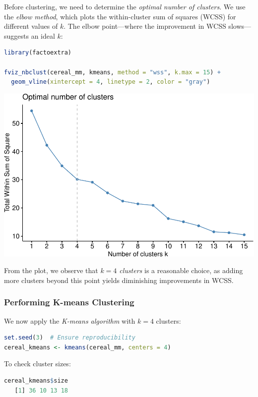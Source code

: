 \documentclass[
]{book}
\theoremstyle{definition}
\theoremstyle{definition}
\theoremstyle{definition}
\theoremstyle{definition}
\theoremstyle{remark}
\begin{document}
Before clustering, we need to determine the \emph{optimal number of clusters}. We use the \emph{elbow method}, which plots the within-cluster sum of squares (WCSS) for different values of \(k\). The elbow point---where the improvement in WCSS slows---suggests an ideal \(k\):

\begin{lstlisting}[language=R]
library(factoextra)

fviz_nbclust(cereal_mm, kmeans, method = "wss", k.max = 15) + 
  geom_vline(xintercept = 4, linetype = 2, color = "gray")
\end{lstlisting}

\begin{center}\includegraphics[width=0.7\linewidth]{clustering_files/figure-latex/unnamed-chunk-11-1} \end{center}

From the plot, we observe that \emph{\(k = 4\) clusters} is a reasonable choice, as adding more clusters beyond this point yields diminishing improvements in WCSS.

\subsubsection*{Performing K-means Clustering}\label{performing-k-means-clustering}

We now apply the \emph{K-means algorithm} with \(k = 4\) clusters:

\begin{lstlisting}[language=R]
set.seed(3)  # Ensure reproducibility
cereal_kmeans <- kmeans(cereal_mm, centers = 4)
\end{lstlisting}

To check cluster sizes:

\begin{lstlisting}[language=R]
cereal_kmeans$size
   [1] 36 10 13 18
\end{lstlisting}
\end{document}
